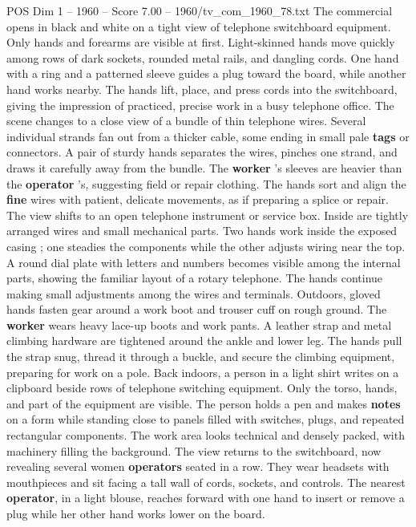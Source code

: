 \begin{textsample}{POS Dim 1 – 1960 – Score 7.00 – 1960/tv\_com\_1960\_78.txt}  \label{ex:f1_pos_071}
The commercial opens in black and white on a tight view of telephone switchboard equipment.
Only hands and forearms are visible at first.
Light-skinned hands move quickly among rows of dark sockets, rounded metal rails, and dangling cords.
One hand with a ring and a patterned sleeve guides a plug toward the board, while another hand works nearby.
The hands lift, place, and press cords into the switchboard, giving the impression of practiced, precise work in a busy telephone office.
The scene changes to a close view of a bundle of thin telephone wires.
Several individual strands fan out from a thicker cable, some ending in small pale \textbf{tags} or connectors.
A pair of sturdy hands separates the wires, pinches one strand, and draws it carefully away from the bundle.
The \textbf{worker} ’s sleeves are heavier than the \textbf{operator} ’s, suggesting field or repair clothing.
The hands sort and align the \textbf{fine} wires with patient, delicate movements, as if preparing a splice or repair.
The view shifts to an open telephone instrument or service box.
Inside are tightly arranged wires and small mechanical parts.
Two hands work inside the exposed casing ; one steadies the components while the other adjusts wiring near the top.
A round dial plate with letters and numbers becomes visible among the internal parts, showing the familiar layout of a rotary telephone.
The hands continue making small adjustments among the wires and terminals.
Outdoors, gloved hands fasten gear around a work boot and trouser cuff on rough ground.
The \textbf{worker} wears heavy lace-up boots and work pants.
A leather strap and metal climbing hardware are tightened around the ankle and lower leg.
The hands pull the strap snug, thread it through a buckle, and secure the climbing equipment, preparing for work on a pole.
Back indoors, a person in a light shirt writes on a clipboard beside rows of telephone switching equipment.
Only the torso, hands, and part of the equipment are visible.
The person holds a pen and makes \textbf{notes} on a form while standing close to panels filled with switches, plugs, and repeated rectangular components.
The work area looks technical and densely packed, with machinery filling the background.
The view returns to the switchboard, now revealing several women \textbf{operators} seated in a row.
They wear headsets with mouthpieces and sit facing a tall wall of cords, sockets, and controls.
The nearest \textbf{operator}, in a light blouse, reaches forward with one hand to insert or remove a plug while her other hand works lower on the board.

\end{textsample}
